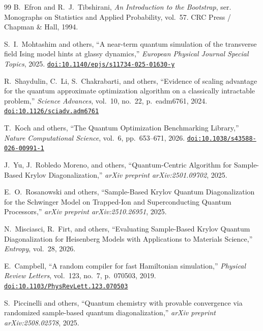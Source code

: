 \documentclass[12pt,a4paper]{report}
\providecommand{\doi}[1]{\href{https://doi.org/#1}{\nolinkurl{doi:#1}}}
\begin{document}
\begin{thebibliography}{99}
B.~Efron and R.~J.~Tibshirani,
\emph{An Introduction to the Bootstrap},
ser. Monographs on Statistics and Applied Probability, vol.~57. CRC Press / Chapman \& Hall, 1994.

S.~I.~Mohtashim and others,
``A near-term quantum simulation of the transverse field Ising model hints at glassy dynamics,''
\emph{European Physical Journal Special Topics}, 2025.
\doi{10.1140/epjs/s11734-025-01630-y}

R.~Shaydulin, C.~Li, S.~Chakrabarti, and others,
``Evidence of scaling advantage for the quantum approximate optimization algorithm on a classically intractable problem,''
\emph{Science Advances}, vol.~10, no.~22, p.~eadm6761, 2024.
\doi{10.1126/sciadv.adm6761}

T.~Koch and others,
``The Quantum Optimization Benchmarking Library,''
\emph{Nature Computational Science}, vol.~6, pp.~653--671, 2026.
\doi{10.1038/s43588-026-00991-1}

J.~Yu, J.~Robledo Moreno, and others,
``Quantum-Centric Algorithm for Sample-Based Krylov Diagonalization,''
\emph{arXiv preprint arXiv:2501.09702}, 2025.

E.~O.~Rosanowski and others,
``Sample-Based Krylov Quantum Diagonalization for the Schwinger Model on Trapped-Ion and Superconducting Quantum Processors,''
\emph{arXiv preprint arXiv:2510.26951}, 2025.

N.~Misciasci, R.~Firt, and others,
``Evaluating Sample-Based Krylov Quantum Diagonalization for Heisenberg Models with Applications to Materials Science,''
\emph{Entropy}, vol.~28, 2026.

E.~Campbell,
``A random compiler for fast Hamiltonian simulation,''
\emph{Physical Review Letters}, vol.~123, no.~7, p.~070503, 2019.
\doi{10.1103/PhysRevLett.123.070503}

S.~Piccinelli and others,
``Quantum chemistry with provable convergence via randomized sample-based quantum diagonalization,''
\emph{arXiv preprint arXiv:2508.02578}, 2025.

\end{thebibliography}
\end{document}
